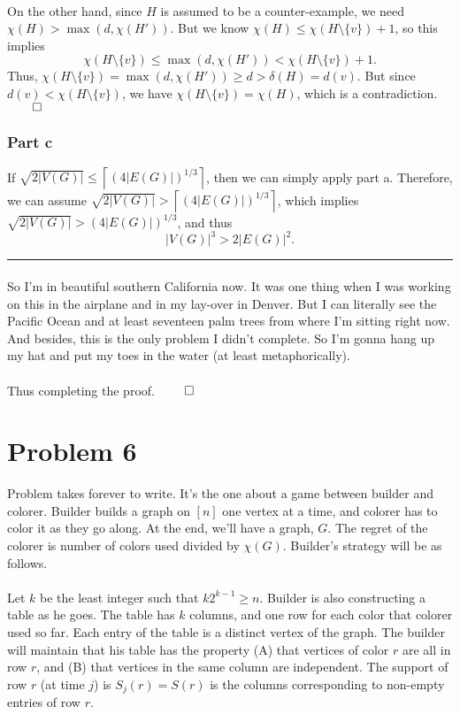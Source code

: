 \documentclass[10pt,a4paper]{article}
\newcommand{\ceil}[1]{\left \lceil #1 \right \rceil}
\newcommand{\1}{\mathbf{1}}
\begin{document}
\paragraph*{}On the other hand, since $H$ is assumed to be a counter-example, we need $\chi(H) > \max(d, \chi(H'))$.  But we know $\chi(H) \leq \chi(H \setminus \{v\}) + 1$, so this implies
\[
\chi(H \setminus \{v\}) \leq \max(d, \chi(H')) < \chi(H \setminus \{v\}) + 1.
\]
Thus, $\chi(H \setminus \{v\}) = \max(d, \chi(H')) \geq d > \delta(H) = d(v)$.  But since $d(v) < \chi(H \setminus \{v\})$, we have $\chi(H \setminus \{v\}) = \chi(H)$, which is a contradiction. $\qed$

\subsubsection*{Part c}
If $\sqrt{2 |V(G)|} \leq \ceil{(4|E(G)|)^{1/3}}$, then we can simply apply part a.  Therefore, we can assume $\sqrt{2 |V(G)|} > \ceil{(4|E(G)|)^{1/3}}$, which implies $\sqrt{2 |V(G)|} > (4 |E(G)|)^{1/3}$, and thus
\[
|V(G)|^3 > 2 |E(G)|^2.
\]
\hrule
\paragraph*{}So I'm in beautiful southern California now.  It was one thing when I was working on this in the airplane and in my lay-over in Denver.  But I can literally see the Pacific Ocean and at least seventeen palm trees from where I'm sitting right now.  And besides, this is the only problem I didn't complete.  So I'm gonna hang up my hat and put my toes in the water (at least metaphorically).
\paragraph*{}Thus completing the proof. $\qed$

\label{pr:5:end}

\section*{Problem 6}\label{pr:6:start}
Problem takes forever to write.  It's the one about a game between builder and colorer.  Builder builds a graph on $[n]$ one vertex at a time, and colorer has to color it as they go along.  At the end, we'll have a graph, $G$.  The regret of the colorer is number of colors used divided by $\chi(G)$.  Builder's strategy will be as follows.
\paragraph*{}Let $k$ be the least integer such that $k 2^{k-1} \geq n$.  Builder is also constructing a table as he goes.  The table has $k$ columns, and one row for each color that colorer used so far.  Each entry of the table is a distinct vertex of the graph.  The builder will maintain that his table has the property (A) that vertices of color $r$ are all in row $r$, and (B) that vertices in the same column are independent.  The support of row $r$ (at time $j$) is $S_{j} (r) = S (r)$ is the columns corresponding to non-empty entries of row $r$.
\end{document}
